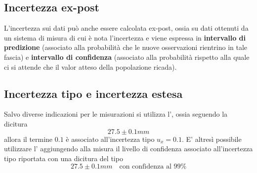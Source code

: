 	\subsection*{Incertezza ex-post}
		L'incertezza sui dati può anche essere calcolata ex-post, ossia su dati ottenuti da un sistema di misura di cui è nota l'incertezza e viene espressa in \textbf{intervallo di predizione} (associato alla probabilità che le nuove osservazioni rientrino in tale fascia) e \textbf{intervallo di confidenza} (associato alla probabilità rispetto alla quale ci si attende che il valor atteso della popolazione ricada).
	
	\subsection{Incertezza tipo e incertezza estesa}
		Salvo diverse indicazioni per le misurazioni si utilizza l', ossia seguendo la dicitura
		\[ 27.5 \pm 0.1mm \]
		allora il termine $0.1$ è associato all'incertezza tipo $u_x = 0.1$. E' altresì possibile utilizzare l' aggiungendo alla misura il livello di confidenza associato all'incertezza tipo riportata con una dicitura del tipo
		\[ 27.5\pm 0.1 mm \quad \textrm{con confidenza al 99\%} \]
	
	
	
	
	
	
	
	
	
